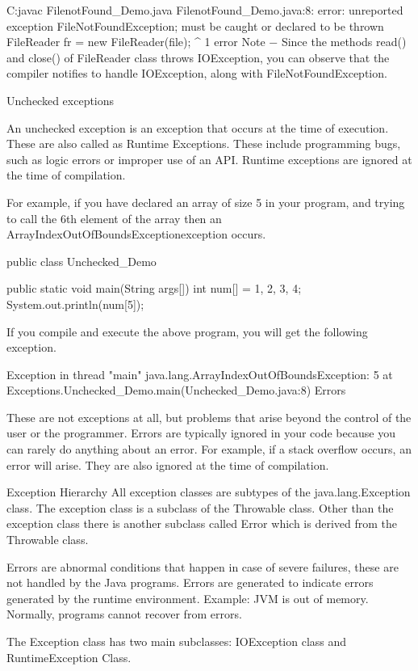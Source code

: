 C:\>javac FilenotFound_Demo.java
FilenotFound_Demo.java:8: error: unreported exception FileNotFoundException; must be caught or declared to be thrown
      FileReader fr = new FileReader(file);
                      ^
1 error
Note − Since the methods read() and close() of FileReader class throws IOException, you can observe that the compiler notifies to handle IOException, along with FileNotFoundException.

Unchecked exceptions

An unchecked exception is an exception that occurs at the time of execution. These are also called as Runtime Exceptions. These include programming bugs, such as logic errors or improper use of an API. Runtime exceptions are ignored at the time of compilation.

For example, if you have declared an array of size 5 in your program, and trying to call the 6th element of the array then an ArrayIndexOutOfBoundsExceptionexception occurs.

public class Unchecked_Demo {

   public static void main(String args[]) {
      int num[] = {1, 2, 3, 4};
      System.out.println(num[5]);
   }
}
If you compile and execute the above program, you will get the following exception.

Exception in thread "main" java.lang.ArrayIndexOutOfBoundsException: 5
    at Exceptions.Unchecked_Demo.main(Unchecked_Demo.java:8)
Errors

These are not exceptions at all, but problems that arise beyond the control of the user or the programmer. Errors are typically ignored in your code because you can rarely do anything about an error. For example, if a stack overflow occurs, an error will arise. They are also ignored at the time of compilation.

Exception Hierarchy
All exception classes are subtypes of the java.lang.Exception class. The exception class is a subclass of the Throwable class. Other than the exception class there is another subclass called Error which is derived from the Throwable class.

Errors are abnormal conditions that happen in case of severe failures, these are not handled by the Java programs. Errors are generated to indicate errors generated by the runtime environment. Example: JVM is out of memory. Normally, programs cannot recover from errors.

The Exception class has two main subclasses: IOException class and RuntimeException Class.



